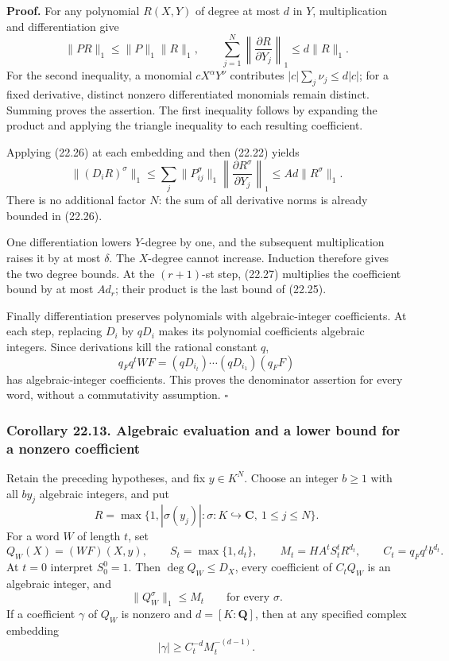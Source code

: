 \documentclass[
  11pt,
  a4paper,
]{article}
\begin{document}
\textbf{Proof.} For any polynomial \(R(X,Y)\) of degree at most \(d\) in
\(Y\), multiplication and differentiation give \[
 \|P R\|_1\le\|P\|_1\|R\|_1,
 \qquad
 \sum_{j=1}^N\left\|\frac{\partial R}{\partial Y_j}\right\|_1
 \le d\|R\|_1.
 \tag{22.26}
\] For the second inequality, a monomial \(cX^\alpha Y^\nu\) contributes
\(|c|\sum_j\nu_j\le d|c|\); for a fixed derivative, distinct nonzero
differentiated monomials remain distinct. Summing proves the assertion.
The first inequality follows by expanding the product and applying the
triangle inequality to each resulting coefficient.

Applying (22.26) at each embedding and then (22.22) yields \[
 \|(D_iR)^\sigma\|_1
 \le\sum_j\|P_{ij}^\sigma\|_1
          \left\|\frac{\partial R^\sigma}{\partial Y_j}\right\|_1
 \le A d\|R^\sigma\|_1.
 \tag{22.27}
\] There is no additional factor \(N\): the sum of all derivative norms
is already bounded in (22.26).

One differentiation lowers \(Y\)-degree by one, and the subsequent
multiplication raises it by at most \(\delta\). The \(X\)-degree cannot
increase. Induction therefore gives the two degree bounds. At the
\((r+1)\)-st step, (22.27) multiplies the coefficient bound by at most
\(A d_r\); their product is the last bound of (22.25).

Finally differentiation preserves polynomials with algebraic-integer
coefficients. At each step, replacing \(D_i\) by \(qD_i\) makes its
polynomial coefficients algebraic integers. Since derivations kill the
rational constant \(q\), \[
 q_Fq^tWF=(qD_{i_t})\cdots(qD_{i_1})(q_FF)
\] has algebraic-integer coefficients. This proves the denominator
assertion for every word, without a commutativity assumption.
\(\square\)

\subsubsection{Corollary 22.13. Algebraic evaluation and a lower bound
for a nonzero
coefficient}\label{corollary-22.13.-algebraic-evaluation-and-a-lower-bound-for-a-nonzero-coefficient}

Retain the preceding hypotheses, and fix \(y\in K^N\). Choose an integer
\(b\ge1\) with all \(by_j\) algebraic integers, and put \[
 R=\max\{1,|\sigma(y_j)|:\sigma:K\hookrightarrow\mathbf C,\ 1\le j\le N\}.
\] For a word \(W\) of length \(t\), set \[
 Q_W(X)=(WF)(X,y),\qquad
 S_t=\max\{1,d_t\},\qquad
 M_t=H A^t S_t^t R^{d_t},\qquad
 C_t=q_Fq^t b^{d_t}.
 \tag{22.28}
\] At \(t=0\) interpret \(S_0^0=1\). Then \(\deg Q_W\le D_X\), every
coefficient of \(C_tQ_W\) is an algebraic integer, and \[
 \|Q_W^\sigma\|_1\le M_t\qquad\text{for every }\sigma.
 \tag{22.29}
\] If a coefficient \(\gamma\) of \(Q_W\) is nonzero and
\(d=[K:\mathbf Q]\), then at any specified complex embedding \[
 |\gamma|\ge C_t^{-d}M_t^{-(d-1)}.
 \tag{22.30}
\]
\end{document}
